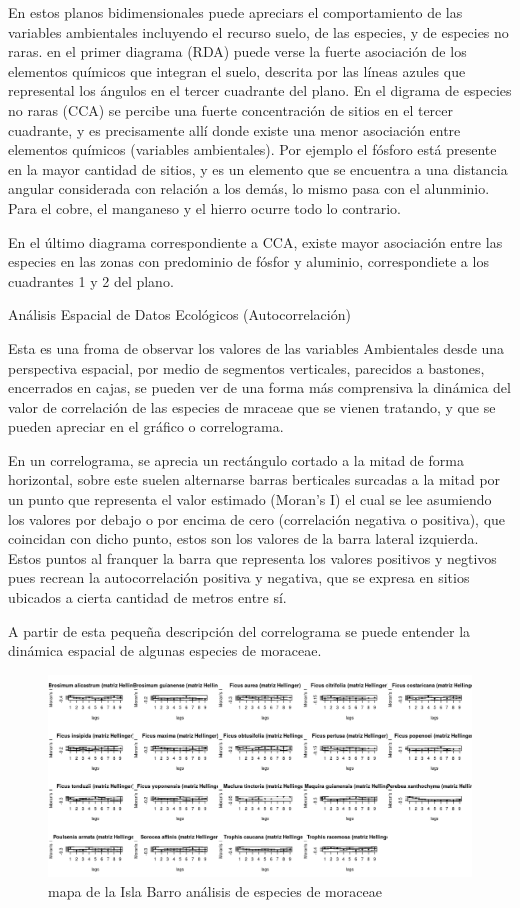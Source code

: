 \documentclass[11pt,]{article}
\begin{document}
En estos planos bidimensionales puede apreciars el comportamiento de las
variables ambientales incluyendo el recurso suelo, de las especies, y de
especies no raras. en el primer diagrama (RDA) puede verse la fuerte
asociación de los elementos químicos que integran el suelo, descrita por
las líneas azules que represental los ángulos en el tercer cuadrante del
plano. En el digrama de especies no raras (CCA) se percibe una fuerte
concentración de sitios en el tercer cuadrante, y es precisamente allí
donde existe una menor asociación entre elementos químicos (variables
ambientales). Por ejemplo el fósforo está presente en la mayor cantidad
de sitios, y es un elemento que se encuentra a una distancia angular
considerada con relación a los demás, lo mismo pasa con el alunminio.
Para el cobre, el manganeso y el hierro ocurre todo lo contrario.

En el último diagrama correspondiente a CCA, existe mayor asociación
entre las especies en las zonas con predominio de fósfor y aluminio,
correspondiete a los cuadrantes 1 y 2 del plano.

Análisis Espacial de Datos Ecológicos (Autocorrelación)

Esta es una froma de observar los valores de las variables Ambientales
desde una perspectiva espacial, por medio de segmentos verticales,
parecidos a bastones, encerrados en cajas, se pueden ver de una forma
más comprensiva la dinámica del valor de correlación de las especies de
mraceae que se vienen tratando, y que se pueden apreciar en el gráfico o
correlograma.

En un correlograma, se aprecia un rectángulo cortado a la mitad de forma
horizontal, sobre este suelen alternarse barras berticales surcadas a la
mitad por un punto que representa el valor estimado (Moran's I) el cual
se lee asumiendo los valores por debajo o por encima de cero
(correlación negativa o positiva), que coincidan con dicho punto, estos
son los valores de la barra lateral izquierda. Estos puntos al franquer
la barra que representa los valores positivos y negtivos pues recrean la
autocorrelación positiva y negativa, que se expresa en sitios ubicados a
cierta cantidad de metros entre sí.

A partir de esta pequeña descripción del correlograma se puede entender
la dinámica espacial de algunas especies de moraceae.

\begin{figure}
\centering
\includegraphics[width=1.00000\textwidth]{multiples_especies.png}
\caption{mapa de la Isla Barro análisis de especies de
moraceae\label{fig:bci_map}}
\end{figure}
\end{document}
